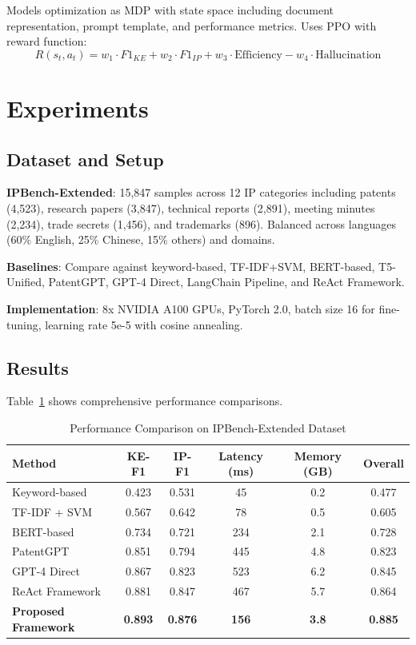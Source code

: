 \documentclass[11pt,a4paper]{article}
\begin{document}
Models optimization as MDP with state space including document representation, prompt template, and performance metrics. Uses PPO \citep{schulman2017proximal} with reward function:
\begin{equation}
R(s_t, a_t) = w_1 \cdot F1_{KE} + w_2 \cdot F1_{IP} + w_3 \cdot \text{Efficiency} - w_4 \cdot \text{Hallucination}
\end{equation}

\section{Experiments}

\subsection{Dataset and Setup}

\textbf{IPBench-Extended}: 15,847 samples across 12 IP categories including patents (4,523), research papers (3,847), technical reports (2,891), meeting minutes (2,234), trade secrets (1,456), and trademarks (896). Balanced across languages (60\% English, 25\% Chinese, 15\% others) and domains.

\textbf{Baselines}: Compare against keyword-based, TF-IDF+SVM, BERT-based, T5-Unified, PatentGPT, GPT-4 Direct, LangChain Pipeline, and ReAct Framework.

\textbf{Implementation}: 8x NVIDIA A100 GPUs, PyTorch 2.0, batch size 16 for fine-tuning, learning rate 5e-5 with cosine annealing.

\subsection{Results}

Table~\ref{tab:main_results} shows comprehensive performance comparisons.

\begin{table}[htbp]
\centering
\caption{Performance Comparison on IPBench-Extended Dataset}
\label{tab:main_results}
\begin{tabular}{lccccc}
\toprule
\textbf{Method} & \textbf{KE-F1} & \textbf{IP-F1} & \textbf{Latency (ms)} & \textbf{Memory (GB)} & \textbf{Overall} \\
\midrule
Keyword-based & 0.423 & 0.531 & 45 & 0.2 & 0.477 \\
TF-IDF + SVM & 0.567 & 0.642 & 78 & 0.5 & 0.605 \\
BERT-based & 0.734 & 0.721 & 234 & 2.1 & 0.728 \\
PatentGPT & 0.851 & 0.794 & 445 & 4.8 & 0.823 \\
GPT-4 Direct & 0.867 & 0.823 & 523 & 6.2 & 0.845 \\
ReAct Framework & 0.881 & 0.847 & 467 & 5.7 & 0.864 \\
\midrule
\textbf{Proposed Framework} & \textbf{0.893} & \textbf{0.876} & \textbf{156} & \textbf{3.8} & \textbf{0.885} \\
\bottomrule
\end{tabular}
\end{table}
\end{document}
